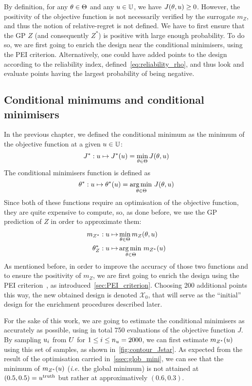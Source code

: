 \documentclass[../../Main_ManuscritThese.tex]{subfiles}
\begin{document}
By definition, for any $\theta\in \Theta$ and any $u \in \mathbb{U}$, we
have $J(\theta, u) \geq 0$.  However, the positivity of the objective
function is not necessarily verified by the surrogate $m_Z$, and thus
the notion of relative-regret is not defined. We have to first ensure
that the GP $Z$ (and consequently $Z^*$) is positive with large enough
probability.  To do so, we are first going to enrich the design near
the conditional minimisers, using the PEI criterion.  Alternatively,
one could have added points to the design according to the reliability
index, defined~\cref{eq:reliability_rho}, and thus look and evaluate points
having the largest probability of being negative.


\subsection{Conditional minimums and conditional minimisers}
\label{ssec:croco_cond_minimum_minimisers}

In the previous chapter, we defined the conditional minimum as the
minimum of the objective function at a given $u\in \mathbb{U}$:
\begin{equation}
  J^* : u \mapsto J^*(u) = \min_{\theta\in\Theta} J(\theta, u)
\end{equation}
The conditional minimisers function is defined as
\begin{equation}
  \theta^*:u  \mapsto \theta^*(u) = \operatorname*{arg\,min \,}_{\theta \in \Theta} J(\theta, u)
\end{equation}
Since both of these functions require an optimisation of the objective
function, they are quite expensive to compute, so, as done before, we
use the GP prediction of $Z$ in order to approximate them:
\begin{align}
  m_{Z^*}: u\mapsto &\min_{\theta \in \Theta} m_Z(\theta, u) \\
  \theta^*_{Z}: u  \mapsto &\operatorname*{arg\,min \,}_{\theta \in \Theta} m_{Z^*}(u)
\end{align}
As mentioned before, in order to improve the accuracy of those two functions and to ensure
the positivity of $m_Z$, we are first going to enrich the design using
the PEI criterion~\citep{ginsbourger_bayesian_2014}, as
introduced~\cref{sec:PEI_criterion}.  Choosing \num{200}
additional points this way, the new obtained design is denoted
$\mathcal{X}_0$, that will serve as the ``initial'' design for the
enrichment procedures described later.

For the sake of this work, we are going to estimate the conditional
minimisers as accurately as possible, using in total \num{750}
evaluations of the objective function $J$. By sampling $u_i$ from
$U$ for $1\leq i \leq n_{u}=\num{2000}$, we can first estimate
$m_{Z^*}(u)$ using this set of samples, as shown
in~\cref{fig:contour_Jstar}. As expected from the result of the
optimisation carried in~\cref{ssec:glob_mini}, we can see that the
minimum of $m_{Z^*}(u)$ (\emph{i.e.} the global minimum) is not
attained at $(0.5, 0.5)=u^{\mathrm{truth}}$ but rather at
approximatively $(\num{0.6},\num{0.3})$.
\end{document}
